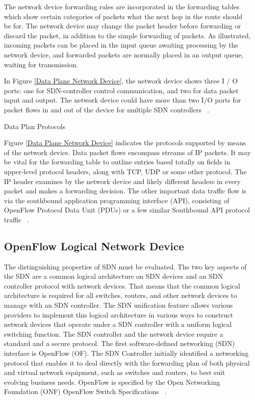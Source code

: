 \documentclass[
  oneside,
  11pt, a4paper,
  footinclude=true,
  headinclude=true,
  cleardoublepage=empty
]{scrbook}
\begin{document}
The network device forwarding rules are incorporated in the forwarding tables which show certain categories of packets what the next hop in the route should be for. The network device may change the packet header before forwarding or discard the packet, in addition to the simple forwarding of packets. As illustrated, incoming packets can be placed in the input queue awaiting processing by the network device, and forwarded packets are normally placed in an output queue, waiting for transmission.\par
In Figure \ref{Data Plane Network Device}, the network device shows three I / O ports: one for SDN-controller control communication, and two for data packet input and output. The network device could have more than two I/O ports for packet flows in and out of the device for multiple SDN controllers ~\cite{stallings2015foundations}.\par

Data Plan Protocols

Figure \ref{Data Plane Network Device} indicates the protocols supported by means of the network device. Data packet flows encompass streams of IP packets. It may be vital for the forwarding table to outline entries based totally on fields in upper-level protocol headers, along with TCP, UDP or some other protocol. The IP header examines by the network device and likely different headers in every packet and makes a forwarding decision. The other important data traffic flow is via the southbound application programming interface (API), consisting of OpenFlow Protocol Data Unit (PDUs) or a few similar Southbound API protocol traffic ~\cite{stallings2015foundations}.\par

\subsection{OpenFlow Logical Network Device}

The distinguishing properties of SDN must be evaluated. The two key aspects of the SDN are a common logical architecture on SDN devices and an SDN controller protocol with network devices.
That means that the common logical architecture is required for all switches, routers, and other network devices to manage with an SDN controller. The SDN unification feature allows various providers to implement this logical architecture in various ways to construct network devices that operate under a SDN controller with a uniform logical switching function.
The SDN controller and the network device require a standard and a secure protocol.
The first software-defined networking (SDN) interface is OpenFlow (OF). The SDN Controller initially identified a networking protocol that enables it to deal directly with the forwarding plan of both physical and virtual network equipment, such as switches and routers, to best suit evolving business needs. OpenFlow is specified by the Open Networking Foundation (ONF) OpenFlow Switch Specifications ~\cite{stallings2015foundations}.
\end{document}
